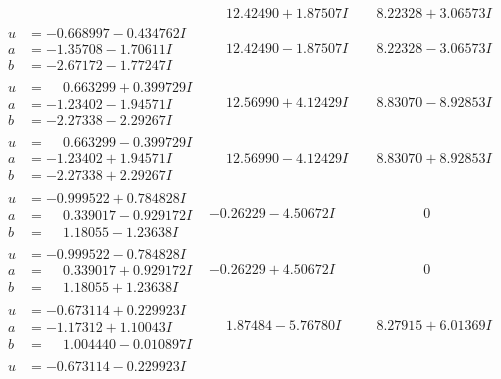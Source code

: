 \documentclass[1p]{elsarticle_modified}
\theoremstyle{definition}
\begin{document}
$$\begin{array}{c|c|c}
 & \phantom{-}12.42490 + 1.87507 I & \phantom{-}8.22328 + 3.06573 I \\ \hline\begin{aligned}
u &= -0.668997 - 0.434762 I \\
a &= -1.35708 - 1.70611 I \\
b &= -2.67172 - 1.77247 I\end{aligned}
 & \phantom{-}12.42490 - 1.87507 I & \phantom{-}8.22328 - 3.06573 I \\ \hline\begin{aligned}
u &= \phantom{-}0.663299 + 0.399729 I \\
a &= -1.23402 - 1.94571 I \\
b &= -2.27338 - 2.29267 I\end{aligned}
 & \phantom{-}12.56990 + 4.12429 I & \phantom{-}8.83070 - 8.92853 I \\ \hline\begin{aligned}
u &= \phantom{-}0.663299 - 0.399729 I \\
a &= -1.23402 + 1.94571 I \\
b &= -2.27338 + 2.29267 I\end{aligned}
 & \phantom{-}12.56990 - 4.12429 I & \phantom{-}8.83070 + 8.92853 I \\ \hline\begin{aligned}
u &= -0.999522 + 0.784828 I \\
a &= \phantom{-}0.339017 - 0.929172 I \\
b &= \phantom{-}1.18055 - 1.23638 I\end{aligned}
 & -0.26229 - 4.50672 I & \phantom{-0.000000 } 0 \\ \hline\begin{aligned}
u &= -0.999522 - 0.784828 I \\
a &= \phantom{-}0.339017 + 0.929172 I \\
b &= \phantom{-}1.18055 + 1.23638 I\end{aligned}
 & -0.26229 + 4.50672 I & \phantom{-0.000000 } 0 \\ \hline\begin{aligned}
u &= -0.673114 + 0.229923 I \\
a &= -1.17312 + 1.10043 I \\
b &= \phantom{-}1.004440 - 0.010897 I\end{aligned}
 & \phantom{-}1.87484 - 5.76780 I & \phantom{-}8.27915 + 6.01369 I \\ \hline\begin{aligned}
u &= -0.673114 - 0.229923 I \\

\end{aligned}
\end{array}$$
\end{document}
